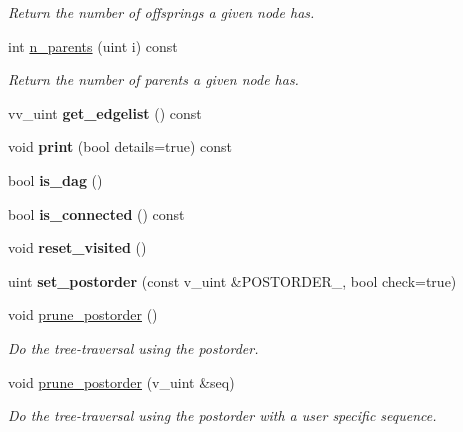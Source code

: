 \begin{DoxyCompactItemize}
\begin{DoxyCompactList}\small\item\em Return the number of offsprings a given node has. \end{DoxyCompactList}\item 
\mbox{\label{classTree_a4bacee9412759e72d7df95127d6f70a2}} 
int \hyperlink{classTree_a4bacee9412759e72d7df95127d6f70a2}{n\+\_\+parents} (uint i) const
\begin{DoxyCompactList}\small\item\em Return the number of parents a given node has. \end{DoxyCompactList}\item 
\mbox{\label{classTree_ae0a8c80679a111970b560c0cdcdbc107}} 
vv\+\_\+uint {\bfseries get\+\_\+edgelist} () const
\item 
\mbox{\label{classTree_a2c14caeb3feb1de3c1478f6ce1cad15f}} 
void {\bfseries print} (bool details=true) const
\item 
\mbox{\label{classTree_af793b391043a88ceea805b584efb982a}} 
bool {\bfseries is\+\_\+dag} ()
\item 
\mbox{\label{classTree_a5b39d33f36af57c2966ccee73bed7e90}} 
bool {\bfseries is\+\_\+connected} () const
\item 
\mbox{\label{classTree_adb83bb19c14623ce57ac6d1b84b1c2ff}} 
void {\bfseries reset\+\_\+visited} ()
\item 
\mbox{\label{classTree_a2de0f68a5de9083a4ff21b54d567fb1a}} 
uint {\bfseries set\+\_\+postorder} (const v\+\_\+uint \&P\+O\+S\+T\+O\+R\+D\+E\+R\+\_\+, bool check=true)
\item 
void \hyperlink{classTree_a7d465880d18acf79f3a772ea5412b0d7}{prune\+\_\+postorder} ()
\begin{DoxyCompactList}\small\item\em Do the tree-\/traversal using the postorder. \end{DoxyCompactList}\item 
void \hyperlink{classTree_a8318027f3d2b1a07bf25e813c7c80056}{prune\+\_\+postorder} (v\+\_\+uint \&seq)
\begin{DoxyCompactList}\small\item\em Do the tree-\/traversal using the postorder with a user specific sequence. \end{DoxyCompactList}\item 

\end{DoxyCompactItemize}
